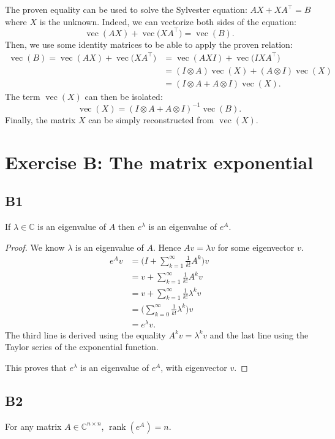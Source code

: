 \documentclass[11pt]{article}
\DeclareMathOperator{\rank}{rank}
\DeclareMathOperator{\vect}{vec}
\newcommand{\complex}{\mathbb{C}} %
\newcommand{\kp}{\otimes} %
\begin{document}
The proven equality can be used to solve the Sylvester equation: $AX+XA^\top=B$ where $X$ is the unknown.
Indeed, we can vectorize both sides of the equation:
\[
    \vect(AX) + \vect\big(XA^\top\big)=\vect(B).
\]
Then, we use some identity matrices to be able to apply the proven relation:
\begin{align*}
    \vect(B) = \vect(AX) + \vect\big(XA^\top\big) &= \vect(AXI) + \vect\big(IXA^\top\big)\\
    &=(I\kp A)\vect(X) + (A\kp I) \vect(X)\\
    &=(I\kp A + A\kp I) \vect(X).
\end{align*}
The term $\vect(X)$ can then be isolated:
\[
    \vect(X)=(I\kp A + A\kp I)^{-1}\vect(B).
\]
Finally, the matrix \(X\) can be simply reconstructed from $\vect(X)$.

\section{Exercise B: The matrix exponential}
\subsection*{B1}
If $\lambda\in \complex$ is an eigenvalue of \(A\) then $e^\lambda$ is an eigenvalue of $e^A$.
\begin{proof}
We know $\lambda$ is an eigenvalue of \(A\).
Hence $Av=\lambda v$ for some eigenvector $v$.
\begin{align*}
    e^Av&=\Bigg(I+\sum^{\infty}_{k=1}\frac{1}{k!}A^k\Bigg)v\\
    &=v+\sum^{\infty}_{k=1}\frac{1}{k!}A^kv\\
    &=v+\sum^{\infty}_{k=1}\frac{1}{k!}\lambda^kv\\
    &=\Bigg(\sum^{\infty}_{k=0}\frac{1}{k!}\lambda^k\Bigg)v\\
    &=e^\lambda v.
\end{align*}
The third line is derived using the equality $A^kv=\lambda^kv$ and the last line using the Taylor series of the exponential function.

This proves that $e^\lambda$ is an eigenvalue of $e^A$, with eigenvector \(v\).
\end{proof}

\subsection*{B2}
For any matrix $A\in \complex^{n\times n}$, $\rank(e^A)=n$.
\end{document}
